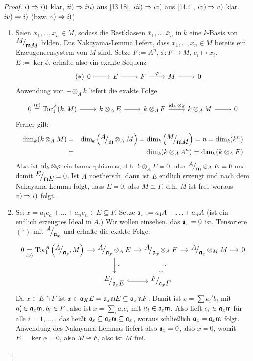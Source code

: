 \begin{proof}
	$i)\Rightarrow i))$ klar, $ii) \Rightarrow iii)$ aus \ref{13.18}, $iii)\Rightarrow iv)$ aus \ref{14.4}, $iv) \Rightarrow v)$ klar.\\
	$iv)\Rightarrow i)$ (bzw. $v) \Rightarrow i)$)
	\begin{enumerate}
		\item Seien $x_1, \ldots, x_n\in M$, sodass die Restklassen $\bar x_1 , \ldots, \bar x_n$ in $k$ eine $k$-Basis von $\QR{M}{\m M}$ bilden. Das Nakayama-Lemma liefert, dass $x_1, \ldots, x_n\in M$ bereits ein Erzeugendensystem von $M$ sind. Setze $F:= A^n, \, \phi: F\to M, \, e_i \mapsto x_i$. $E:= \ker \phi$, erhalte also ein exakte Sequenz
		\begin{equation}\tag{$\ast$}
		\begin{tikzcd}
		0\arrow{r} & E\arrow{r} & F \arrow{r}{\phi} & M \arrow{r} & 0
		\end{tikzcd}
		\end{equation}
		Anwendung von $-\otimes_A k$ liefert die exakte Folge 
		$$\begin{tikzcd}
		0 \overset{iv)}{=} \Tor_1^A(k,M) \arrow{r} & k \otimes_A E \arrow{r} & k \otimes_A F \arrow{r}{\id_k\otimes \phi} & k \otimes_A M \arrow{r} & 0
		\end{tikzcd}$$
		Ferner gilt:
		\begin{eqnarray*}
		\dim_k(k\otimes_A M) &=& \dim_k\left(\QR{A}{\m} \otimes_AM\right) = \dim_k\left(\QR{M}{\m M}\right) = n = \dim_k(k^n)\\
		& = &\dim_k(k \otimes_A A^n) = \dim_k(k \otimes_A F)
		\end{eqnarray*}
		Also ist $\operatorname{id}_k \otimes \varphi$ ein Isomorphismus, d.h. $k\otimes_A E = 0$, also $\QR{A}{\m}\otimes_A E = 0$ und damit $\QR{E}{\m E} =0$. Ist $A$ noethersch, dann ist $E$ endlich erzeugt und nach dem Nakayama-Lemma folgt, dass $E=0$, also $M\cong F$, d.h. $M$ ist frei, woraus $v) \Rightarrow i)$ folgt.
		\item Sei $x= a_1 e_a + \ldots + a_n e_n\in E\subseteq F$. Setze $\mathfrak{a}_x:= a_1 A + \ldots + a_n A$ (ist ein endlich erzeugtes Ideal in $A$.) Wir wollen einsehen. das $\mathfrak{a}_x=0$ ist. Tensoriere $(\ast)$ mit $\QR{A}{\a_x}$ und erhalte die exakte Folge:
		$$\begin{tikzcd}[column sep = small]
		0 \underset{iv)}{=} \Tor_1^A\left( \QR{A}{\a_x}, M\right)\arrow{r} & \QR{A}{\a_x}\otimes_A E \arrow{d}{\sim} \arrow{r} & \QR{A}{\a_x} \otimes_A F \arrow{r}  \arrow{d}{\sim} & \QR{A}{\a_x} \otimes_M M \arrow{r} & 0\\
		& \QR{E}{\a_x E} \arrow[hook]{r} & \QR{F}{\a_x F} & &
		\end{tikzcd}$$
		Da $x\in E \cap F$ ist $x\in \mathfrak{a}_XE= \mathfrak{a}_x \mathfrak{m} E \subseteq \mathfrak{a}_x \mathfrak{m} F$. Damit ist $x= \sum a_i' b_i$ mit $a_i' \in \mathfrak{a}_x \mathfrak{m},\, b_i \in F$, also ist $x= \sum_i \tilde{a}_i e_i$ mit $\tilde{a}_i \in \mathfrak{a}_x \mathfrak{m}$. Also lieft $a_i \in \mathfrak{a}_x \mathfrak{m} $ für alle $i=1,\ldots, $, das heißt $\mathfrak{a}_x \subseteq \mathfrak{a}_x \mathfrak{m} \subseteq \mathfrak{a}_x$, woraus schließlich $\mathfrak{a}_x = \mathfrak{a}_x \mathfrak{m}$ folgt. Anwendung des Nakayama-Lemmas liefert also $\mathfrak{a}_x=0$, also $x=0$, womit $E = \ker \phi =0$, also $M \cong F$, also ist $M$ frei.
	\end{enumerate}
\end{proof}
